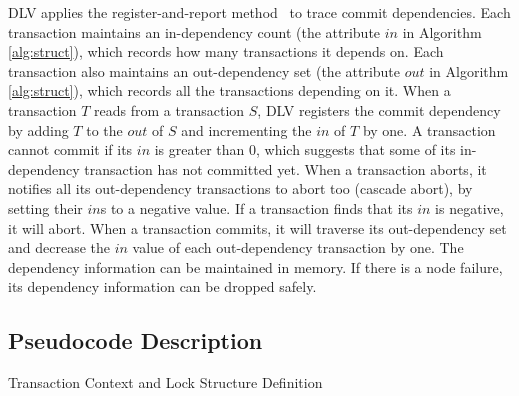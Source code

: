 \documentclass[conference]{IEEEtran}
\begin{document}
DLV applies the register-and-report method~\cite{HeckatonMVCC:journals/pvldb/LarsonBDFPZ11} to trace commit dependencies.
Each transaction maintains an in-dependency count (the attribute ${in}$ in Algorithm \ref{alg:struct}), which records how many transactions it depends on.
Each transaction also maintains an out-dependency set (the attribute ${out}$ in Algorithm \ref{alg:struct}), which records all the transactions depending on it.
When a transaction ${T}$ reads from a transaction ${S}$,
DLV registers the commit dependency by adding ${T}$ to the ${out}$ of ${S}$ and incrementing the ${in}$ of ${T}$ by one.
A transaction cannot commit if its ${in}$ is greater than 0, which suggests that some of its in-dependency transaction has not committed yet.
When a transaction aborts, it notifies all its out-dependency transactions to abort too (cascade abort), by setting their ${in}$s to a negative value.
If a transaction finds that its ${in}$ is negative, it will abort.
When a transaction commits, it will traverse its out-dependency set and decrease the ${in}$ value of each out-dependency transaction by one.
The dependency information can be maintained in memory.
If there is a node failure, its dependency information can be dropped safely. 


\subsection{Pseudocode Description}

\begin{algorithm}
  \caption{Transaction Context and Lock Structure Definition}
  \label{alg:struct}

\end{algorithm}
\end{document}
